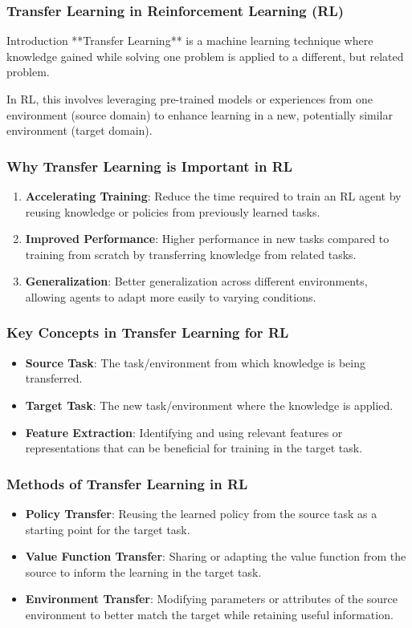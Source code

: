 \documentclass{beamer}
\begin{document}
\begin{frame}[fragile]
    \frametitle{Transfer Learning in Reinforcement Learning (RL)}
    \begin{block}{Introduction}
        **Transfer Learning** is a machine learning technique where knowledge gained while solving one problem is applied to a different, but related problem.
    \end{block}
    In RL, this involves leveraging pre-trained models or experiences from one environment (source domain) to enhance learning in a new, potentially similar environment (target domain).
\end{frame}

\begin{frame}[fragile]
    \frametitle{Why Transfer Learning is Important in RL}
    \begin{enumerate}
        \item \textbf{Accelerating Training}: Reduce the time required to train an RL agent by reusing knowledge or policies from previously learned tasks.
        \item \textbf{Improved Performance}: Higher performance in new tasks compared to training from scratch by transferring knowledge from related tasks.
        \item \textbf{Generalization}: Better generalization across different environments, allowing agents to adapt more easily to varying conditions.
    \end{enumerate}
\end{frame}

\begin{frame}[fragile]
    \frametitle{Key Concepts in Transfer Learning for RL}
    \begin{itemize}
        \item \textbf{Source Task}: The task/environment from which knowledge is being transferred.
        \item \textbf{Target Task}: The new task/environment where the knowledge is applied.
        \item \textbf{Feature Extraction}: Identifying and using relevant features or representations that can be beneficial for training in the target task.
    \end{itemize}
\end{frame}

\begin{frame}[fragile]
    \frametitle{Methods of Transfer Learning in RL}
    \begin{itemize}
        \item \textbf{Policy Transfer}: Reusing the learned policy from the source task as a starting point for the target task.
        \item \textbf{Value Function Transfer}: Sharing or adapting the value function from the source to inform the learning in the target task.
        \item \textbf{Environment Transfer}: Modifying parameters or attributes of the source environment to better match the target while retaining useful information.
    \end{itemize}
\end{frame}
\end{document}
